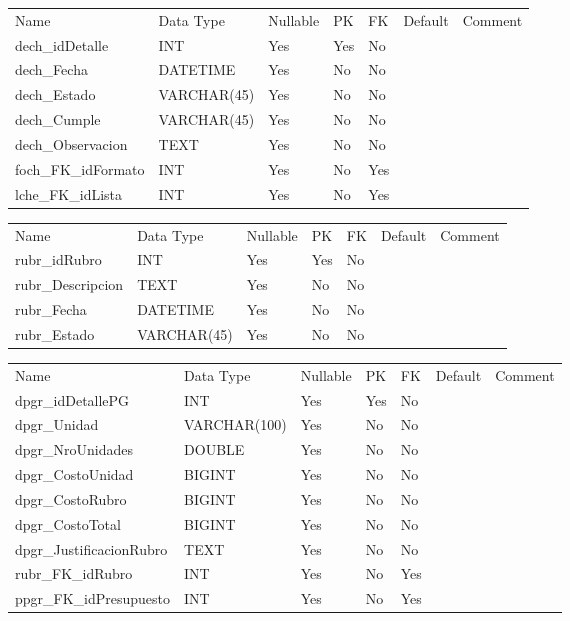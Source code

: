 			\begin{center}
				\begin{tabular}{ |l|l|l|l|l|l|l| }
					\hline
					Name & Data Type & Nullable & PK & FK & Default & Comment \\
					dech_idDetalle & INT & Yes & Yes & No &  & \\ \hline 
dech_Fecha & DATETIME & Yes & No & No &  & \\ \hline 
dech_Estado & VARCHAR(45) & Yes & No & No &  & \\ \hline 
dech_Cumple & VARCHAR(45) & Yes & No & No &  & \\ \hline 
dech_Observacion & TEXT & Yes & No & No &  & \\ \hline 
foch_FK_idFormato & INT & Yes & No & Yes &  & \\ \hline 
lche_FK_idLista & INT & Yes & No & Yes &  & \\ \hline 

				\end{tabular}
			\end{center}
		

			\begin{center}
				\begin{tabular}{ |l|l|l|l|l|l|l| }
					\hline
					Name & Data Type & Nullable & PK & FK & Default & Comment \\
					rubr_idRubro & INT & Yes & Yes & No &  & \\ \hline 
rubr_Descripcion & TEXT & Yes & No & No &  & \\ \hline 
rubr_Fecha & DATETIME & Yes & No & No &  & \\ \hline 
rubr_Estado & VARCHAR(45) & Yes & No & No &  & \\ \hline 

				\end{tabular}
			\end{center}
		

			\begin{center}
				\begin{tabular}{ |l|l|l|l|l|l|l| }
					\hline
					Name & Data Type & Nullable & PK & FK & Default & Comment \\
					dpgr_idDetallePG & INT & Yes & Yes & No &  & \\ \hline 
dpgr_Unidad & VARCHAR(100) & Yes & No & No &  & \\ \hline 
dpgr_NroUnidades & DOUBLE & Yes & No & No &  & \\ \hline 
dpgr_CostoUnidad & BIGINT & Yes & No & No &  & \\ \hline 
dpgr_CostoRubro & BIGINT & Yes & No & No &  & \\ \hline 
dpgr_CostoTotal & BIGINT & Yes & No & No &  & \\ \hline 
dpgr_JustificacionRubro & TEXT & Yes & No & No &  & \\ \hline 
rubr_FK_idRubro & INT & Yes & No & Yes &  & \\ \hline 
ppgr_FK_idPresupuesto & INT & Yes & No & Yes &  & \\ \hline 

				\end{tabular}
			\end{center}
		

